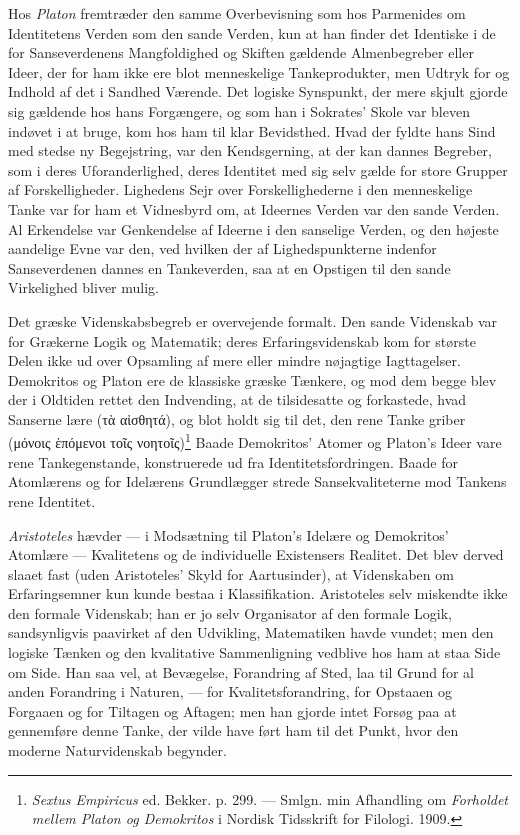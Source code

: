 \documentclass[12pt,a4paper]{book}
\newcommand{\opage}[1]{\marginnote{\footnotesize\textit{[#1]}}}
\begin{document}
Hos \emph{Platon} fremtræder den samme Overbevisning som hos Parmenides
om Identitetens Verden som den sande Verden, kun at han finder det
Identiske i de for Sanseverdenens Mangfoldighed og Skiften gældende
Almenbegreber eller Ideer, der for ham ikke ere blot menneskelige
Tankeprodukter, men Udtryk for og Indhold af det i Sandhed Værende. Det
logiske Synspunkt, der mere skjult gjorde sig gældende hos hans
Forgængere, og som han i Sokrates' Skole var bleven indøvet i at bruge,
kom hos ham til klar Bevidsthed. Hvad der fyldte hans Sind med stedse ny
Begejstring, var den Kendsgerning, at der kan dannes Begreber, som i
deres Uforanderlighed, deres Identitet med sig selv gælde for store
Grupper af Forskelligheder. Lighedens Sejr over Forskellighederne i den
menneskelige Tanke var for ham et Vidnesbyrd om, at Ideernes Verden var
den sande Verden. Al Erkendelse var Genkendelse af Ideerne i den
sanselige Verden, og den højeste aandelige Evne var den, ved hvilken der
af Lighedspunkterne indenfor Sanseverdenen dannes en Tankeverden, saa at
en Opstigen til den sande Virkelighed bliver mulig.

Det græske Videnskabsbegreb er overvejende formalt. Den sande Videnskab
var for Grækerne Logik og Matematik; deres Erfaringsvidenskab kom for
største Delen ikke ud over Opsamling af mere eller mindre nøjagtige
Iagttagelser. \opage{126} Demokritos og Platon ere de klassiske græske Tænkere, og
mod dem begge blev der i Oldtiden rettet den Indvending, at de
tilsidesatte og forkastede, hvad Sanserne lære (τὰ αἰσθητά), og blot
holdt sig til det, den rene Tanke griber (μόνοις ἑπόμενοι τοῖς
νοητοῖς)\footnote{\emph{Sextus Empiricus} ed. Bekker. p. 299. --- Smlgn.
min Afhandling om \emph{Forholdet mellem Platon og Demokritos} i Nordisk
Tidsskrift for Filologi. 1909.} Baade Demokritos' Atomer og Platon's
Ideer vare rene Tankegenstande, konstruerede ud fra Identitetsfordringen.
Baade for Atomlærens og for Idelærens Grundlægger strede Sansekvaliteterne
mod Tankens rene Identitet.

\emph{Aristoteles} hævder --- i Modsætning til Platon's Idelære og
Demokritos' Atomlære --- Kvalitetens og de individuelle Existensers
Realitet. Det blev derved slaaet fast (uden Aristoteles' Skyld for
Aartusinder), at Videnskaben om Erfaringsemner kun kunde bestaa i
Klassifikation. Aristoteles selv miskendte ikke den formale Videnskab;
han er jo selv Organisator af den formale Logik, sandsynligvis paavirket
af den Udvikling, Matematiken havde vundet; men den logiske Tænken og den
kvalitative Sammenligning vedblive hos ham at staa Side om Side. Han saa
vel, at Bevægelse, Forandring af Sted, laa til Grund for al anden
Forandring i Naturen, --- for Kvalitetsforandring, for Opstaaen og
Forgaaen og for Tiltagen og Aftagen; men han gjorde intet Forsøg paa at
gennemføre denne Tanke, der vilde have ført ham til det Punkt, hvor den
moderne Naturvidenskab begynder.
\end{document}
